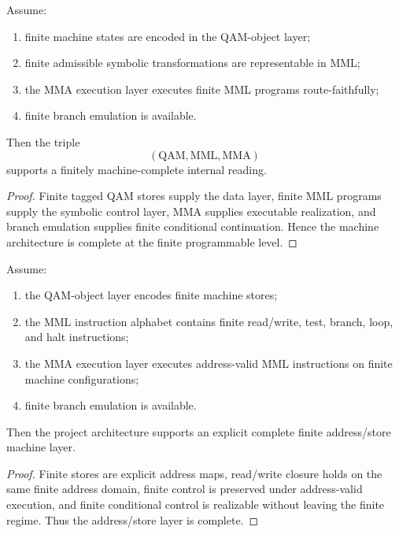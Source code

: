 \begin{theorem}\label{thm:first-finite-machine-completeness-computational-layer}
Assume:
\begin{enumerate}[leftmargin=2em]
    \item finite machine states are encoded in the QAM-object layer;
    \item finite admissible symbolic transformations are representable in MML;
    \item the MMA execution layer executes finite MML programs route-faithfully;
    \item finite branch emulation is available.
\end{enumerate}
Then the triple
\[
(\mathrm{QAM},\mathrm{MML},\mathrm{MMA})
\]
supports a finitely machine-complete internal reading.
\end{theorem}

\begin{proof}
Finite tagged QAM stores supply the data layer, finite MML programs supply the symbolic control layer, MMA supplies executable realization, and branch emulation supplies finite conditional continuation. Hence the machine architecture is complete at the finite programmable level.
\end{proof}

\begin{theorem}\label{thm:finite-address-store-completeness-computational-layer}
Assume:
\begin{enumerate}[leftmargin=2em]
    \item the QAM-object layer encodes finite machine stores;
    \item the MML instruction alphabet contains finite read/write, test, branch, loop, and halt instructions;
    \item the MMA execution layer executes address-valid MML instructions on finite machine configurations;
    \item finite branch emulation is available.
\end{enumerate}
Then the project architecture supports an explicit complete finite address/store machine layer.
\end{theorem}

\begin{proof}
Finite stores are explicit address maps, read/write closure holds on the same finite address domain, finite control is preserved under address-valid execution, and finite conditional control is realizable without leaving the finite regime. Thus the address/store layer is complete.
\end{proof}

